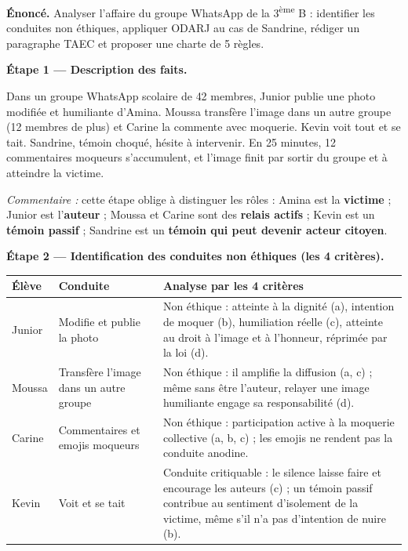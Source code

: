 \documentclass[11pt]{article}
\begin{document}
\begin{exoresolu}
\textbf{Énoncé.} Analyser l'affaire du groupe WhatsApp de la 3\textsuperscript{ème} B : identifier les conduites non éthiques, appliquer ODARJ au cas de Sandrine, rédiger un paragraphe TAEC et proposer une charte de 5 règles.

\tcblower

\textbf{Étape 1 — Description des faits.}

Dans un groupe WhatsApp scolaire de 42 membres, Junior publie une photo modifiée et humiliante d'Amina. Moussa transfère l'image dans un autre groupe (12 membres de plus) et Carine la commente avec moquerie. Kevin voit tout et se tait. Sandrine, témoin choqué, hésite à intervenir. En 25 minutes, 12 commentaires moqueurs s'accumulent, et l'image finit par sortir du groupe et à atteindre la victime.

\emph{Commentaire :} cette étape oblige à distinguer les rôles : Amina est la \textbf{victime} ; Junior est l'\textbf{auteur} ; Moussa et Carine sont des \textbf{relais actifs} ; Kevin est un \textbf{témoin passif} ; Sandrine est un \textbf{témoin qui peut devenir acteur citoyen}.

\textbf{Étape 2 — Identification des conduites non éthiques (les 4 critères).}

\begin{center}
\begin{tabularx}{\linewidth}{|l|X|X|}
\hline
\rowcolor{popblueL}
\textbf{Élève} & \textbf{Conduite} & \textbf{Analyse par les 4 critères} \\
\hline
Junior & Modifie et publie la photo & Non éthique : atteinte à la dignité (a), intention de moquer (b), humiliation réelle (c), atteinte au droit à l'image et à l'honneur, réprimée par la loi (d). \\
\hline
Moussa & Transfère l'image dans un autre groupe & Non éthique : il amplifie la diffusion (a, c) ; même sans être l'auteur, relayer une image humiliante engage sa responsabilité (d). \\
\hline
Carine & Commentaires et emojis moqueurs & Non éthique : participation active à la moquerie collective (a, b, c) ; les emojis ne rendent pas la conduite anodine. \\
\hline
Kevin & Voit et se tait & Conduite critiquable : le silence laisse faire et encourage les auteurs (c) ; un témoin passif contribue au sentiment d'isolement de la victime, même s'il n'a pas d'intention de nuire (b). \\
\hline
\end{tabularx}
\end{center}


\end{exoresolu}
\end{document}
